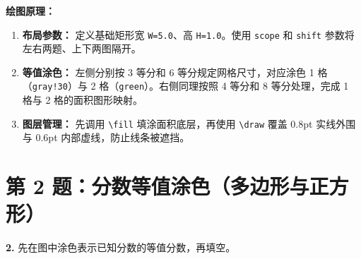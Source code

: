 \vspace{0.5cm}
\textbf{绘图原理：}
\begin{enumerate}
    \item \textbf{布局参数：} 定义基础矩形宽 \texttt{W=5.0}、高 \texttt{H=1.0}。使用 \texttt{scope} 和 \texttt{shift} 参数将左右两题、上下两图隔开。
    \item \textbf{等值涂色：} 左侧分别按 3 等分和 6 等分规定网格尺寸，对应涂色 1 格（\texttt{gray!30}）与 2 格（\texttt{green}）。右侧同理按照 4 等分和 8 等分处理，完成 1 格与 2 格的面积图形映射。
    \item \textbf{图层管理：} 先调用 \texttt{\textbackslash fill} 填涂面积底层，再使用 \texttt{\textbackslash draw} 覆盖 0.8pt 实线外围与 0.6pt 内部虚线，防止线条被遮挡。
\end{enumerate}

\vspace{1.5cm}

\section*{第 2 题：分数等值涂色（多边形与正方形）}

\textbf{2.} 先在图中涂色表示已知分数的等值分数，再填空。

